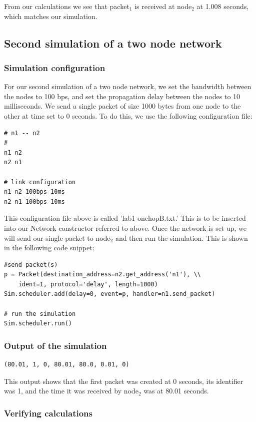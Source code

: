 \documentclass[fleqn,11pt]{article}
\begin{document}
From our calculations we see that packet$_1$ is received at node$_2$ at 1.008 seconds, which matches our simulation.

 \subsection{Second simulation of a two node network}
\subsubsection{Simulation configuration}
For our second simulation of a two node network, we set the bandwidth between the nodes to 100 bps, and set the propagation delay between the nodes to 10 milliseconds. We send a single packet of size 1000 bytes from one node to the other at time set to 0 seconds. To do this, we use the following configuration file:

\begin{lstlisting}
# n1 -- n2
#
n1 n2
n2 n1

# link configuration
n1 n2 100bps 10ms
n2 n1 100bps 10ms

\end{lstlisting}

This configuration file above is called 'lab1-onehopB.txt.' This is to be inserted into our Network constructor referred to above.
Once the network is set up, we will send our single packet to node$_2$ and then run the simulation. This is shown in the following code snippet:    

\begin{lstlisting}
#send packet(s)
p = Packet(destination_address=n2.get_address('n1'), \\
	ident=1, protocol='delay', length=1000)
Sim.scheduler.add(delay=0, event=p, handler=n1.send_packet)

# run the simulation
Sim.scheduler.run()
\end{lstlisting}

\subsubsection{Output of the simulation}
\begin{lstlisting}
(80.01, 1, 0, 80.01, 80.0, 0.01, 0)
\end{lstlisting}
This output shows that the first packet was created at 0 seconds, its identifier was 1, and the time it was received by node$_2$ was at 80.01 seconds.

\subsubsection{Verifying calculations}
\end{document}
